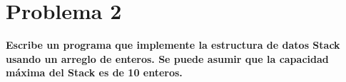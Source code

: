 \section*{Problema 2}
\textbf{Escribe un programa que implemente la estructura de datos Stack usando un arreglo de enteros. Se puede asumir que la capacidad máxima del Stack es de 10 enteros.}